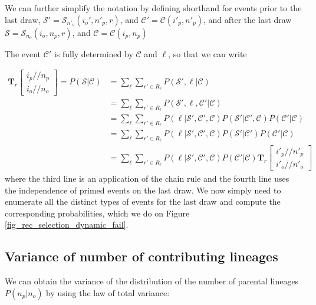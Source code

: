 \documentclass[review,nonatbib]{elsarticle}
\newcommand{\dslash}{/\!\!/}
\newcommand{\Coalc}[4]{\begin{bmatrix}#1\dslash #2 \\ #3\dslash #4 \end{bmatrix}}
\newcommand{\CC}{\mathcal{C}}
\newcommand{\ms}{\mathcal{S}}
\begin{document}
We can further simplify the notation by defining shorthand for events prior to the last draw,
 $\ms' = \ms_{n'_o}(i_o', n'_p, r)$, and $\CC' = \CC{(i'_p,n'_p)}$, and after the
last draw $\ms = \ms_{n_o}(i_o, n_p, r)$, and $\CC = \CC{(i_p,n_p)}$

The event  $\CC'$ is fully determined by  $\CC$ and $\ell$, so that we can write

\begin{equation}
  \begin{split}
    \mathbf{T}_{r}\Coalc{i_p}{n_p}{i_o}{n_o} = P(\ms| \CC) &= \sum_\ell \sum_{r' \in R_\ell}
    P(\ms',\ell | \CC) \\ 
    &=\sum_\ell \sum_{r' \in R_\ell}P( \ms',\ell, \CC' |\CC) \\
    &=\sum_\ell \sum_{r' \in R_\ell}P(\ell | \ms', \CC', \CC ) P( \ms'| \CC', \CC)  P(\CC' |\CC) \\
    &=\sum_\ell \sum_{r' \in R_\ell}P(\ell | \ms', \CC', \CC ) P( \ms'| \CC')       P(\CC' |\CC) \\
    &=\sum_\ell \sum_{r' \in R_\ell}P(\ell | \ms', \CC', \CC ) P(\CC' |\CC)  \mathbf{T}_{r}\Coalc{i'_p}{n'_p}{i'_o}{n'_o}
  \end{split}
\end{equation}
where the third line is an application of the chain rule and the fourth line uses the independence
of primed events on the last draw.  We now simply need to enumerate all the distinct types of
events for the last draw and compute the corresponding probabilities, which we do on Figure
\ref{fig_rec_selection_dynamic_fail}.


\subsection{Variance of number of contributing lineages}
\label{subsec_apx_variance}

We can obtain the variance of the distribution of the number of parental lineages $P(n_p | n_o)$ by using the law of total variance:
\end{document}
